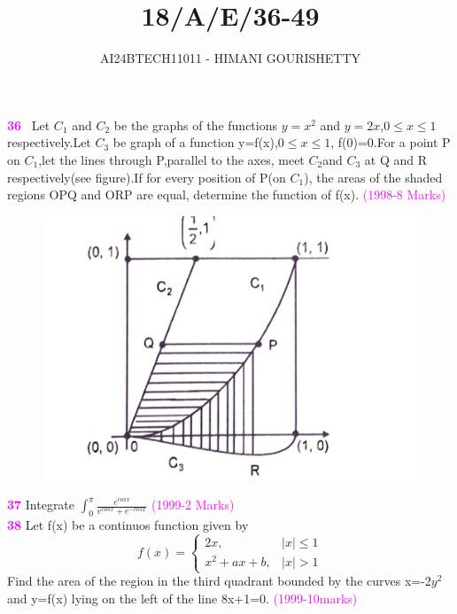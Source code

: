 \documentclass[journal,12pt,twocolumn]{IEEEtran}
\theoremstyle{remark}
\begin{document}

\vspace{3cm}

\title{18/A/E/36-49}
\author{AI24BTECH11011 - HIMANI GOURISHETTY}
\maketitle
\newpage
\bigskip

\renewcommand{\thefigure}{\theenumi}
\renewcommand{\thetable}{\theenumi}


\textbf{\textcolor{magenta}{36}}
\ Let $C_1$ and $C_2$ be the graphs of the functions $y=x^2$ and $y=2x$,$0\le x\le1$ respectively.Let $C_3$ be graph of a function y=f(x),$0\le x \le 1$, f(0)=0.For a point P on $C_1$,let the lines through P,parallel to the axes, meet $C_2$and $C_3$ at Q and R respectively(see figure).If for every position of P(on $C_1$), the areas of the shaded regions OPQ and ORP are equal, determine the function of f(x).
    \hfill{\textcolor{magenta}{(1998-8 Marks)}}
        \begin{figure}[h!]
	        \centering
		        \includegraphics[width=1\linewidth]{figs/fig1.png}
			        \label{fig:11011}
				    \end{figure}
				        
					\textbf{\textcolor{magenta}{37}}
					   Integrate $\int_{0}^{\pi}\frac{e^{cosx}}{e^{cosx}+e^{-cosx}}$
					            \hfill{\textcolor{magenta}{(1999-2 Marks)}}\\
						             
							      \textbf{\textcolor{magenta}{38}}
							        Let f(x) be a continuos function given by \\
								     \[
								          f(x)=
									       \begin{cases}
									                2x,&|x|\le1\\
											         x^2+ax+b,&|x|>1
												      \end{cases}
												           \]
													    Find the area of the region in the third quadrant bounded by the curves x=-2$y^2$ and y=f(x) lying on the left of the line 8x+1=0.  
													        \hfill{\textcolor{magenta}{(1999-10marks)}}\\
														    
\end{document}
